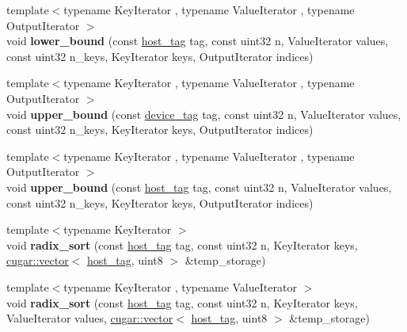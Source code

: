 \begin{DoxyCompactItemize}
\item 
\mbox{\label{namespacecugar_a7fbcb9abc68c623915d5b30d68b24d4a}} 
{\footnotesize template$<$typename Key\+Iterator , typename Value\+Iterator , typename Output\+Iterator $>$ }\\void {\bfseries lower\+\_\+bound} (const \hyperlink{structcugar_1_1host__tag}{host\+\_\+tag} tag, const uint32 n, Value\+Iterator values, const uint32 n\+\_\+keys, Key\+Iterator keys, Output\+Iterator indices)
\item 
\mbox{\label{namespacecugar_a3620c123ae25a127c2a7bb2dc174abc1}} 
{\footnotesize template$<$typename Key\+Iterator , typename Value\+Iterator , typename Output\+Iterator $>$ }\\void {\bfseries upper\+\_\+bound} (const \hyperlink{structcugar_1_1device__tag}{device\+\_\+tag} tag, const uint32 n, Value\+Iterator values, const uint32 n\+\_\+keys, Key\+Iterator keys, Output\+Iterator indices)
\item 
\mbox{\label{namespacecugar_aa0a4d383adb05d6d497a518b5d374d8e}} 
{\footnotesize template$<$typename Key\+Iterator , typename Value\+Iterator , typename Output\+Iterator $>$ }\\void {\bfseries upper\+\_\+bound} (const \hyperlink{structcugar_1_1host__tag}{host\+\_\+tag} tag, const uint32 n, Value\+Iterator values, const uint32 n\+\_\+keys, Key\+Iterator keys, Output\+Iterator indices)
\item 
\mbox{\label{namespacecugar_a9ebf5ffd0583f0de3ec15f9020be27d2}} 
{\footnotesize template$<$typename Key\+Iterator $>$ }\\void {\bfseries radix\+\_\+sort} (const \hyperlink{structcugar_1_1host__tag}{host\+\_\+tag} tag, const uint32 n, Key\+Iterator keys, \hyperlink{structcugar_1_1vector}{cugar\+::vector}$<$ \hyperlink{structcugar_1_1host__tag}{host\+\_\+tag}, uint8 $>$ \&temp\+\_\+storage)
\item 
\mbox{\label{namespacecugar_a36a7a395b82285bfe0f1d6b7cfe69c1e}} 
{\footnotesize template$<$typename Key\+Iterator , typename Value\+Iterator $>$ }\\void {\bfseries radix\+\_\+sort} (const \hyperlink{structcugar_1_1host__tag}{host\+\_\+tag} tag, const uint32 n, Key\+Iterator keys, Value\+Iterator values, \hyperlink{structcugar_1_1vector}{cugar\+::vector}$<$ \hyperlink{structcugar_1_1host__tag}{host\+\_\+tag}, uint8 $>$ \&temp\+\_\+storage)

\end{DoxyCompactItemize}
